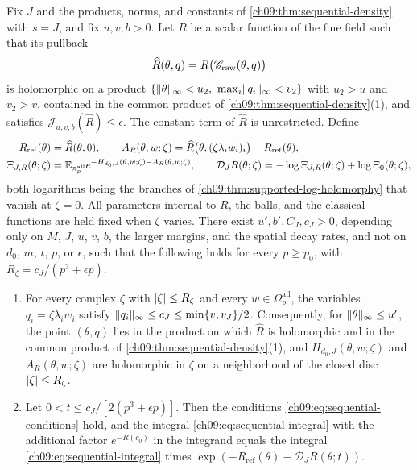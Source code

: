 \begin{lemma}\label{ch09:lem:marked-insertion}
Fix $J$ and the products, norms, and constants of \cref{ch09:thm:sequential-density} with $s=J$, and fix $u,v,b>0$. Let $R$ be a scalar function of the fine field such that its pullback
\[
 \widehat R(\theta,q)=R\bigl(\mathscr C_{\mathrm{raw}}(\theta,q)\bigr)
\]
is holomorphic on a product $\{\norm\theta_\infty<u_2,\ \max_i\norm{q_i}_\infty<v_2\}$ with $u_2>u$ and $v_2>v$, contained in the common product of \cref{ch09:thm:sequential-density}(1), and satisfies $\mathcal J_{u,v,b}(\widehat R)\le\epsilon$. The constant term of $\widehat R$ is unrestricted. Define
\begin{align*}
 R_{\mathrm{ref}}(\theta)&=\widehat R(\theta,0),\qquad A_R(\theta,w;\zeta)=\widehat R\bigl(\theta,(\zeta\lambda_iw_i)_i\bigr)-R_{\mathrm{ref}}(\theta),\\
 \Xi_{J,R}(\theta;\zeta)&=\mathbb E_{\pi_p^{\mathrm{all}}}e^{-H_{d_0,J}(\theta,w;\zeta)-A_R(\theta,w;\zeta)},\qquad
 \mathcal D_JR(\theta;\zeta)=-\log\Xi_{J,R}(\theta;\zeta)+\log\Xi_0(\theta;\zeta),
\end{align*}
both logarithms being the branches of \cref{ch09:thm:supported-log-holomorphy} that vanish at $\zeta=0$. All parameters internal to $R$, the balls, and the classical functions are held fixed when $\zeta$ varies. There exist $u',b',C_J,c_J>0$, depending only on $M$, $J$, $u$, $v$, $b$, the larger margins, and the spatial decay rates, and not on $d_0$, $m$, $t$, $p$, or $\epsilon$, such that the following holds for every $p\ge p_0$, with $R_\zeta=c_J/(p^3+\epsilon p)$.
\begin{enumerate}
\item For every complex $\zeta$ with $\lvert \zeta\rvert\le R_\zeta$ and every $w\in\Omega_p^{\mathrm{all}}$, the variables $q_i=\zeta\lambda_iw_i$ satisfy $\lVert q_i\rVert_\infty\le c_J\le\min\{v,v_J\}/2$. Consequently, for $\lVert \theta\rVert_\infty\le u'$, the point $(\theta,q)$ lies in the product on which $\widehat R$ is holomorphic and in the common product of \cref{ch09:thm:sequential-density}(1), and $H_{d_0,J}(\theta,w;\zeta)$ and $A_R(\theta,w;\zeta)$ are holomorphic in $\zeta$ on a neighborhood of the closed disc $\lvert \zeta\rvert\le R_\zeta$.
\item Let $0<t\le c_J/[2(p^3+\epsilon p)]$. Then the conditions \eqref{ch09:eq:sequential-conditions} hold, and the integral \eqref{ch09:eq:sequential-integral} with the additional factor $e^{-R(c_0)}$ in the integrand equals the integral \eqref{ch09:eq:sequential-integral} times $\exp(-R_{\mathrm{ref}}(\theta)-\mathcal D_JR(\theta;t))$.

\end{enumerate}
\end{lemma}
